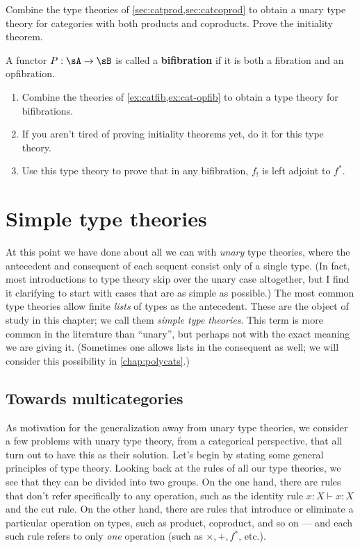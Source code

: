 \documentclass{book}
\let\types\vdash
\begin{document}
\begin{ex}\label{ex:cat-prod-coprod}
  Combine the type theories of \cref{sec:catprod,sec:catcoprod} to obtain a unary type theory for categories with both products and coproducts.
  Prove the initiality theorem.
\end{ex}

\begin{ex}\label{ex:cat-bifib}
  A functor $P:\sA\to\sB$ is called a \textbf{bifibration} if it is both a fibration and an opfibration.
  \begin{enumerate}
  \item Combine the theories of \cref{ex:catfib,ex:cat-opfib} to obtain a type theory for bifibrations.
  \item If you aren't tired of proving initiality theorems yet, do it for this type theory.
  \item Use this type theory to prove that in any bifibration, $f_!$ is left adjoint to $f^*$.
  \end{enumerate}
\end{ex}

\chapter{Simple type theories}
\label{chap:simple}

At this point we have done about all we can with \emph{unary} type theories, where the antecedent and consequent of each sequent consist only of a single type.
(In fact, most introductions to type theory skip over the unary case altogether, but I find it clarifying to start with cases that are as simple as possible.)
The most common type theories allow finite \emph{lists} of types as the antecedent.
These are the object of study in this chapter; we call them \emph{simple type theories}.
This term is more common in the literature than ``unary'', but perhaps not with the exact meaning we are giving it.
(Sometimes one allows lists in the consequent as well; we will consider this possibility in \cref{chap:polycats}.)

\section{Towards multicategories}
\label{sec:why-multicats}

As motivation for the generalization away from unary type theories, we consider a few problems with unary type theory, from a categorical perspective, that all turn out to have this as their solution.
Let's begin by stating some general principles of type theory.
Looking back at the rules of all our type theories, we see that they can be divided into two groups.
On the one hand, there are rules that don't refer specifically to any operation, such as the identity rule $x:X \types x:X$ and the cut rule.
On the other hand, there are rules that introduce or eliminate a particular operation on types, such as product, coproduct, and so on --- and each such rule refers to only \emph{one} operation  (such as $\times,+,f^*$, etc.).
\end{document}
